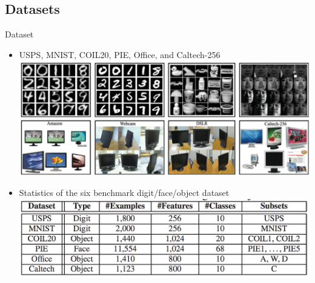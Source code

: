 \documentclass{beamer}
\begin{document}
\subsection{Datasets}
\begin{frame}
{Dataset}
\begin{itemize}
\item USPS, MNIST, COIL20, PIE, Office, and Caltech-256\\ 
\includegraphics[height=0.33\textheight]{figs/d4.png}\\
\item Statistics of the six benchmark digit/face/object dataset\\ \includegraphics[height=0.3\textheight]{figs/t1.png}
\end{itemize}
\end{frame}
\end{document}
